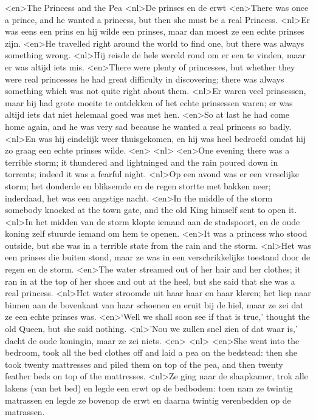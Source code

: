 <en>The Princess and the Pea
<nl>De prinses en de erwt
<en>There was once a prince, and he wanted a princess, but then she must be a real Princess.
<nl>Er was eens een prins en hij wilde een prinses, maar dan moest ze een echte prinses zijn.
<en>He travelled right around the world to find one, but there was always something wrong.
<nl>Hij reisde de hele wereld rond om er een te vinden, maar er was altijd iets mis.
<en>There were plenty of princesses, but whether they were real princesses he had great difficulty in discovering; there was always something which was not quite right about them.
<nl>Er waren veel prinsessen, maar hij had grote moeite te ontdekken of het echte prinsessen waren; er was altijd iets dat niet helemaal goed was met hen.
<en>So at last he had come home again, and he was very sad because he wanted a real princess so badly.
<nl>En  was hij eindelijk weer thuisgekomen,  en hij was heel bedroefd omdat hij zo graag een echte prinses wilde.
<en>
<nl>
<en>One evening there was a terrible storm; it thundered and lightninged and the rain poured down in torrents; indeed it was a fearful night.
<nl>Op een avond was er een vreselijke storm; het donderde en bliksemde en de regen stortte met bakken neer; inderdaad, het was een angstige nacht.
<en>In the middle of the storm somebody knocked at the town gate, and the old King himself sent to open it.
<nl>In het midden van de storm klopte iemand aan de stadspoort, en de oude koning zelf stuurde iemand om hem te openen.
<en>It was a princess who stood outside, but she was in a terrible state from the rain and the storm.
<nl>Het was een prinses die buiten stond, maar ze was in een verschrikkelijke toestand door de regen en de storm.
<en>The water streamed out of her hair and her clothes; it ran in at the top of her shoes and out at the heel, but she said that she was a real princess.
<nl>Het water stroomde uit haar haar en haar kleren; het liep naar binnen aan de bovenkant van haar schoenen en eruit bij de hiel, maar ze zei dat ze een echte prinses was.
<en>‘Well we shall soon see if that is true,’ thought the old Queen, but she said nothing.
<nl>'Nou we zullen snel zien of dat waar is,' dacht de oude koningin, maar ze zei niets.
<en>
<nl>
<en>She went into the bedroom, took all the bed clothes off and laid a pea on the bedstead: then she took twenty mattresses and piled them on top of the pea, and then twenty feather beds on top of the mattresses.
<nl>Ze ging naar de slaapkamer, trok alle lakens (van het bed) en legde een erwt op de bedbodem: toen nam ze twintig matrassen en legde ze bovenop de erwt en daarna twintig verenbedden op de matrassen.
